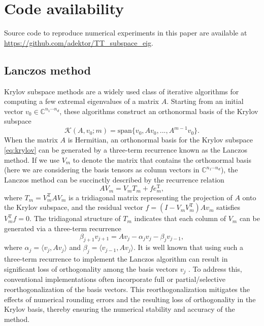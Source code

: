 \documentclass[10pt,preprint]{elsarticle}
\renewcommand{\top}{\text{T}}
\begin{document}
\section*{Code availability}
Source code to reproduce numerical experiments in this paper are available at \url{https://github.com/adektor/TT_subspace_eig}.




\begin{appendices}

\section{Lanczos method}
\label{sec:krylov}

Krylov subspace methods are a widely used class of iterative algorithms for computing a few extremal eigenvalues of a matrix $A$. Starting from an initial vector $v_0 \in \mathbb{C}^{n_1 \cdots n_d}$, these algorithms construct an orthonormal basis of the Krylov subspace 
\begin{equation} \label{eq:krylov}
\mathcal{K}(A,v_0;m) = \text{span}\{v_0, Av_0,...,A^{m-1}v_0\}.
\end{equation} 
When the matrix $A$ is Hermitian, an orthonormal basis for the Krylov subspace \eqref{eq:krylov} can be generated by a three-term recurrence known as the Lanczos method. If we use $V_m$ to denote the matrix that contains the orthonormal basis (here we are considering the basis tensors as column vectors in $\mathbb{C}^{n_1\cdots n_d}$), the Lanczos method can be succinctly described by the recurrence relation 
\begin{equation}
A V_m = V_m T_m + fe_m^{\top},
\label{eq:lanfact}
\end{equation}
where $T_m = V_m^{\top} A V_m$ is a tridiagonal matrix representing the projection of $A$ onto the Krylov subspace, and the residual vector $f = (I-V_mV_m^{\top})A v_m$ satisfies $V_m^{\top} f = 0$. The tridiagonal structure of $T_m$ indicates that each column of $V_m$ can be generated via a three-term recurrence 
\begin{equation} \label{eq:3term}
\beta_{j+1} v_{j+1} = A v_j - \alpha_j v_j - \beta_{j}v_{j-1}, 
\end{equation}
where $\alpha_j = \langle v_j, A v_j \rangle$ and $\beta_j = \langle v_{j-1}, A v_j\rangle$. It is well known that using such a three-term recurrence to implement the Lanczos algorithm can result in significant loss of orthogonality among the basis vectors $v_j$ \cite{Simon1984}. To address this, conventional implementations often incorporate full or partial/selective reorthogonalization of the basis vectors. This reorthogonalization mitigates the effects of numerical rounding errors and the resulting loss of orthogonality in the Krylov basis, thereby ensuring the numerical stability and accuracy of the method. 



\end{appendices}
\end{document}
